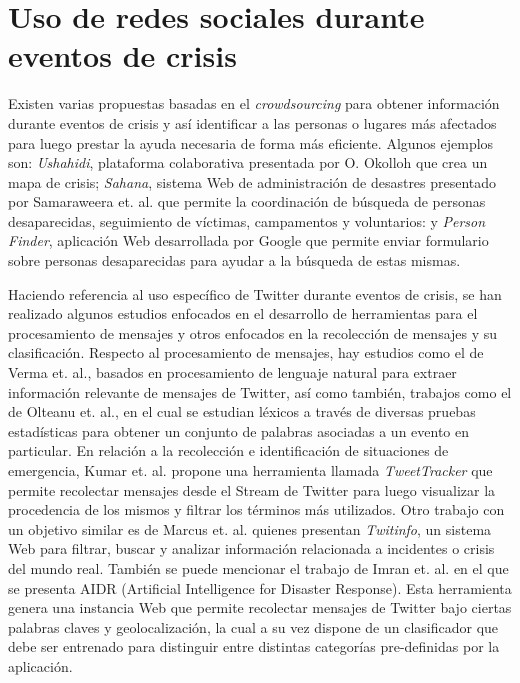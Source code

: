 \section{Uso de redes sociales durante eventos de crisis}
\label{sec:desastres}


Existen varias propuestas basadas en el \textit{crowdsourcing} para obtener información durante eventos de crisis y así identificar a las personas o lugares más afectados para luego prestar la ayuda necesaria de forma más eficiente. 
%
Algunos ejemplos son: \textit{Ushahidi}, plataforma colaborativa presentada por O. Okolloh\cite{okolloh2009ushahidi} que crea un mapa de crisis; \textit{Sahana}, sistema Web de administración de desastres presentado por Samaraweera et. al.\cite{samaraweera2007sahana} que permite la coordinación de búsqueda de personas desaparecidas, seguimiento de víctimas, campamentos y voluntarios: y \textit{Person Finder}, aplicación Web desarrollada por Google que permite enviar formulario sobre personas desaparecidas para ayudar a la búsqueda de estas mismas\cite{PersonFinder}. 

Haciendo referencia al uso específico de Twitter durante eventos de crisis, se han realizado algunos estudios enfocados en el desarrollo de herramientas para el procesamiento de mensajes y otros enfocados en la recolección de mensajes y su clasificación.
%
Respecto al procesamiento de mensajes, hay estudios como el de Verma et. al.\cite{verma2011natural}, basados en procesamiento de lenguaje natural para extraer información relevante de mensajes de Twitter, así como también, trabajos como el de Olteanu et. al.\cite{olteanu2014crisislex}, en el cual se estudian léxicos a través de diversas pruebas estadísticas para obtener un conjunto de palabras asociadas a un evento en particular.
%
En relación a la recolección e identificación de situaciones de emergencia, Kumar et. al.\cite{kumar2011tweettracker} propone una herramienta llamada {\em TweetTracker} que permite recolectar mensajes desde el Stream de Twitter para luego visualizar la procedencia de los mismos y filtrar los términos más utilizados. %
%
Otro trabajo con un objetivo similar es de Marcus et. al.\cite{marcus2011twitinfo} quienes presentan {\em Twitinfo}, un sistema Web para filtrar, buscar y analizar información relacionada a incidentes o crisis del mundo real.
%
También se puede mencionar el trabajo de Imran et. al. \cite{imran2014aidr} en el que se presenta AIDR (Artificial Intelligence for Disaster Response). Esta herramienta genera una instancia Web que permite recolectar mensajes de Twitter bajo ciertas palabras claves y geolocalización, la cual a su vez dispone de un clasificador que debe ser entrenado para distinguir entre distintas categorías pre-definidas por la aplicación.


